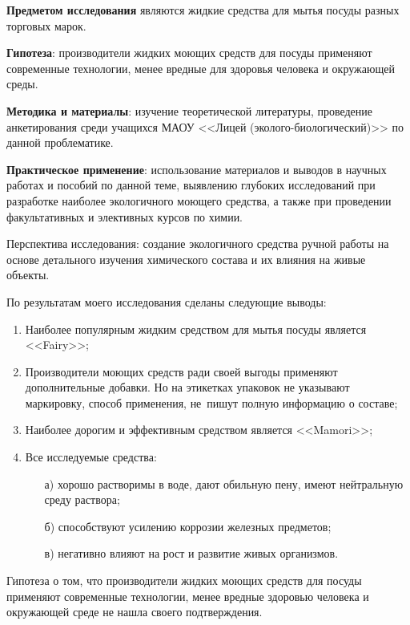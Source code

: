 \textbf{Предметом исследования} являются жидкие средства для мытья посуды разных торговых марок.

\textbf{Гипотеза}: производители жидких моющих средств для посуды применяют современные технологии, менее вредные для здоровья человека и окружающей среды.

\textbf{Методика и материалы}: изучение теоретической литературы, проведение анкетирования среди учащихся МАОУ <<Лицей (эколого-биологический)>> по данной проблематике.

\textbf{Практическое применение}: использование материалов и выводов в  научных работах и пособий по данной теме, выявлению глубоких исследований при разработке наиболее экологичного моющего средства, а также при проведении факультативных и элективных курсов по химии.

Перспектива исследования: создание экологичного средства ручной работы на основе детального изучения химического состава и их влияния на живые объекты.

По результатам моего исследования сделаны следующие выводы:
\begin{enumerate}[noitemsep]\vspace{-8pt}
\item Наиболее популярным жидким средством для мытья посуды является <<Fairy>>;
\item Производители моющих средств ради своей выгоды применяют дополнительные добавки. Но на этикетках упаковок не указывают маркировку, способ применения, не~пишут полную информацию о составе;
\item Наиболее дорогим и эффективным средством является <<Mamori>>;\\
\item Все исследуемые средства:
\begin{itemize}[noitemsep]
  \item[а)] хорошо растворимы в воде, дают обильную пену, имеют нейтральную среду раствора;
  \item[б)] способствуют усилению коррозии железных предметов;
  \item[в)] негативно влияют на рост и развитие живых организмов.
\end{itemize}
\end{enumerate}\vspace{-8pt}

Гипотеза о том, что производители жидких моющих средств для посуды применяют современные технологии, менее вредные здоровью человека и окружающей среде не нашла своего подтверждения.


